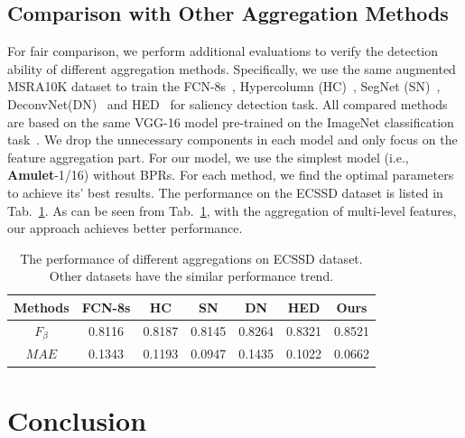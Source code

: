 \documentclass[10pt,twocolumn,letterpaper]{article}
\begin{document}
\subsection{Comparison with Other Aggregation Methods}
For fair comparison, we perform additional evaluations to verify the detection ability of different aggregation methods.
%
Specifically, we use the same augmented MSRA10K dataset to train the FCN-8s~\cite{long2015fully}, Hypercolumn (HC)~\cite{hariharan2015hypercolumns}, SegNet (SN)~\cite{segnet}, DeconvNet(DN)~\cite{noh2015learning} and HED~\cite{xie2015holistically} for saliency detection task.
%
All compared methods are based on the same VGG-16 model pre-trained on the ImageNet classification task~\cite{simonyan2014very}.
%
We drop the unnecessary components in each model and only focus on the feature aggregation part.
For our model, we use the simplest model (i.e., \textbf{Amulet}-1/16) without BPRs.
%
For each method, we find the optimal parameters to achieve its' best results.
%
The performance on the ECSSD dataset is listed in Tab.~\ref{table:aggregation}. As can be seen from Tab.~\ref{table:aggregation}, with the aggregation of multi-level features, our approach achieves better performance.
\begin{table}
\begin{center}
\begin{tabular}{|c|c|c|c|c|c|c|}
\hline
Methods &\textbf{FCN-8s}&\textbf{HC}&\textbf{SN}&\textbf{DN}&\textbf{HED}&\textbf{Ours}\\
\hline
$F_\beta$&0.8116&0.8187& 0.8145 & 0.8264 &0.8321&0.8521        \\
\hline
$MAE$    &0.1343&0.1193& 0.0947& 0.1435& 0.1022&0.0662       \\
\hline
\end{tabular}
\end{center}
\vspace{-3mm}
\caption{The performance of different aggregations on ECSSD dataset. Other datasets have the similar performance trend.}
\label{table:aggregation}
\vspace{-6mm}
\end{table}
\section{Conclusion}
\end{document}

